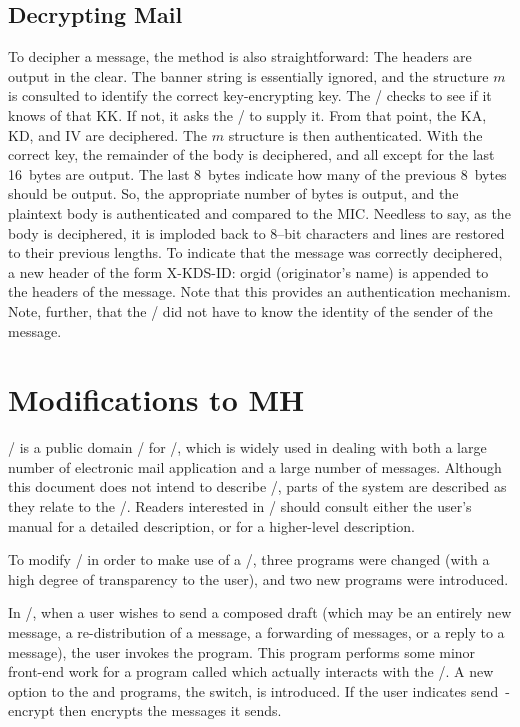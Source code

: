 \subsection{Decrypting Mail}
To decipher a message, the method is also straightforward:
The headers are output in the clear.
The banner string is essentially ignored,
and the structure $m$ is consulted to identify the correct key-encrypting key.
The \TMA/ checks to see if it knows of that KK.
If not, it asks the \KDS/ to supply it.
From that point,
the KA, KD, and IV are deciphered.
The $m$ structure is then authenticated.
With the correct key,
the remainder of the body is deciphered,
and all except for the last 16~bytes are output.
The last 8~bytes indicate how many of the previous 8~bytes should be output.
So,
the appropriate number of bytes is output,
and the plaintext body is authenticated and compared to the MIC.
Needless to say,
as the body is deciphered,
it is imploded back to 8--bit characters and lines are restored to their
previous lengths.
To indicate that the message was correctly deciphered,
a new header of the form
\example X-KDS-ID: orgid (originator's name)\endexample
is appended to the headers of the message.
Note that this provides an authentication mechanism.
Note, further,
that the \UA/ did not have to know the identity of the sender of the message.

\section{Modifications to MH}
\MH/ is a public domain \UA/ for \unix/,
which is widely used in dealing with both a large number of electronic mail
application and a large number of messages.
Although this document does not intend to describe \MH/,
parts of the system are described as they relate to the \TMA/.
Readers interested in \MH/ should consult either the user's
manual\cite{MRose85a} for a detailed description,
or \cite{MRose85d} for a higher-level description.

To modify \MH/ in order to make use of a \TMA/,
three programs were changed (with a high degree of transparency to the user),
and two new programs were introduced.

In \MH/,
when a user wishes to send a composed draft
(which may be an entirely new message,
a re-distribution of a message,
a forwarding of messages,
or a reply to a message),
the user invokes the  program.
This program performs some minor front-end work for a program called
 which actually interacts with the \MTS/.
A new option to the  and  programs,
the  switch,
is introduced.
If the user indicates
\example send\ -encrypt\endexample
then  encrypts the messages it sends.

